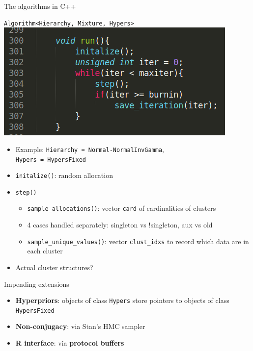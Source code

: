 \begin{frame}{The algorithms in C++}
	\begin{center}
		\texttt{Algorithm<Hierarchy, Mixture, Hypers>}
		\includegraphics[scale=0.4]{../etc/neal8_2.png}
	\end{center}
	\begin{itemize}
		\item Example: \texttt{Hierarchy = Normal-NormalInvGamma}, \\ \texttt{Hypers = HypersFixed}
		\item \texttt{initalize()}: random allocation
		\item \texttt{step()}
		\begin{itemize}
			\item \texttt{sample\_allocations()}: vector \texttt{card} of cardinalities of clusters
			\item 4 cases handled separately: singleton vs !singleton, aux vs old
			\item \texttt{sample\_unique\_values()}: vector \texttt{clust\_idxs} to record which data are in each cluster
		\end{itemize}
		\item Actual cluster structures?
	\end{itemize}
\end{frame}


\begin{frame}{Impending extensions}
	\begin{itemize}
	   \item \textbf{Hyperpriors}: objects of class \texttt{Hypers} store pointers to objects of class \texttt{HypersFixed} %
	   \item \textbf{Non-conjugacy}: via Stan's HMC sampler
	   \item  \textbf{R interface}: via \textbf{protocol buffers}
	\end{itemize}
\end{frame}

